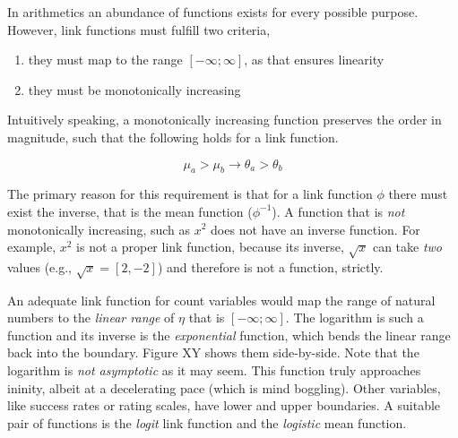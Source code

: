 \documentclass[]{svmono}
\providecommand{\tightlist}{%
  \setlength{\itemsep}{0pt}\setlength{\parskip}{0pt}}
\theoremstyle{definition}
\theoremstyle{definition}
\theoremstyle{definition}
\theoremstyle{remark}
\begin{document}
In arithmetics an abundance of functions exists for every possible
purpose. However, link functions must fulfill two criteria,

\begin{enumerate}
\def\labelenumi{\arabic{enumi}.}
\tightlist
\item
  they must map to the range \([-\infty; \infty]\), as that ensures
  linearity
\item
  they must be monotonically increasing
\end{enumerate}

Intuitively speaking, a monotonically increasing function preserves the
order in magnitude, such that the following holds for a link function.

\[
\mu_a > \mu_b \rightarrow \theta_a > \theta_b
\]

The primary reason for this requirement is that for a link function
\(\phi\) there must exist the inverse, that is the mean function
(\(\phi^{-1}\)). A function that is \emph{not} monotonically increasing,
such as \(x^2\) does not have an inverse function. For example, \(x^2\)
is not a proper link function, because its inverse, \(\sqrt{x}\) can
take \emph{two} values (e.g., \(\sqrt{x} = [2, -2]\)) and therefore is
not a function, strictly.

An adequate link function for count variables would map the range of
natural numbers to the \emph{linear range} of \(\eta\) that is
\([-\infty; \infty]\). The logarithm is such a function and its inverse
is the \emph{exponential} function, which bends the linear range back
into the boundary. Figure XY shows them side-by-side. Note that the
logarithm is \emph{not asymptotic} as it may seem. This function truly
approaches ininity, albeit at a decelerating pace (which is mind
boggling). Other variables, like success rates or rating scales, have
lower and upper boundaries. A suitable pair of functions is the
\emph{logit} link function and the \emph{logistic} mean function.
\end{document}
